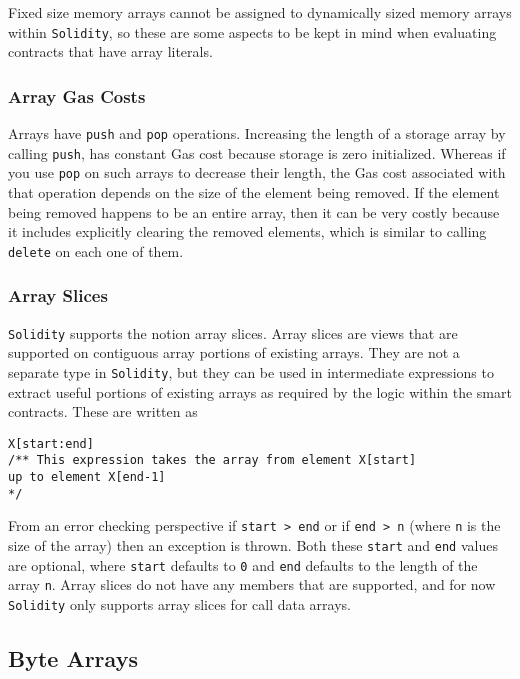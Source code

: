 Fixed size memory arrays cannot be assigned to dynamically sized memory
arrays within \texttt{Solidity}, so these are some aspects to be kept in
mind when evaluating contracts that have array literals.

\subsubsection{Array Gas Costs}\label{array-gas-costs}

Arrays have \texttt{push} and \texttt{pop} operations. Increasing the
length of a storage array by calling \texttt{push}, has constant Gas
cost because storage is zero initialized. Whereas if you use
\texttt{pop} on such arrays to decrease their length, the Gas cost
associated with that operation depends on the size of the element being
removed. If the element being removed happens to be an entire array,
then it can be very costly because it includes explicitly clearing the
removed elements, which is similar to calling \texttt{delete} on each
one of them.

\subsubsection{Array Slices}\label{array-slices}

\texttt{Solidity} supports the notion array slices. Array slices are
views that are supported on contiguous array portions of existing
arrays. They are not a separate type in \texttt{Solidity}, but they can
be used in intermediate expressions to extract useful portions of
existing arrays as required by the logic within the smart contracts.
These are written as

\begin{lstlisting}[language=Solidity,numbers=none]
X[start:end]
/** This expression takes the array from element X[start]
up to element X[end-1]
*/
\end{lstlisting}

From an error checking perspective if
\texttt{start\ \textgreater{}\ end} or if
\texttt{end\ \textgreater{}\ n} (where \texttt{n} is the size of the
array) then an exception is thrown. Both these \texttt{start} and
\texttt{end} values are optional, where \texttt{start} defaults to
\texttt{0} and \texttt{end} defaults to the length of the array
\texttt{n}. Array slices do not have any members that are supported, and
for now \texttt{Solidity} only supports array slices for call data
arrays.

\subsection{Byte Arrays}\label{byte-arrays}

